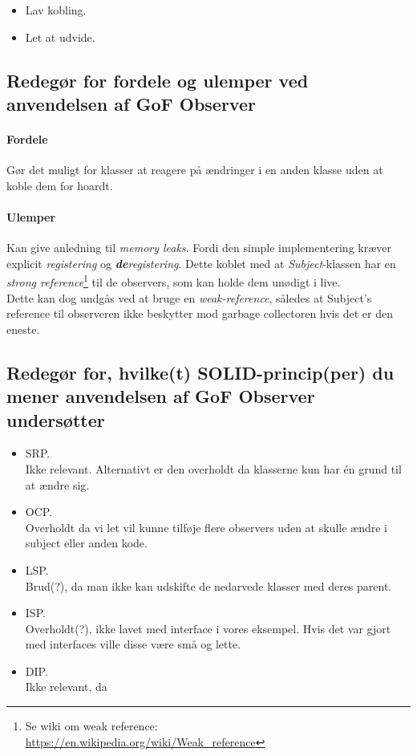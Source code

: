 \begin{itemize}
	\item Lav kobling.
	\item Let at udvide.
\end{itemize}

\subsection{Redegør for fordele og ulemper ved anvendelsen af GoF Observer}

\paragraph{Fordele}
Gør det muligt for klasser at reagere på ændringer i en anden klasse uden at koble dem for hoardt.

\paragraph{Ulemper}
Kan give anledning til \textit{memory leaks}. Fordi den simple implementering kræver explicit \textit{registering} og \textit{\textbf{de}registering}. Dette koblet med at \textit{Subject}-klassen har en \textit{strong reference}\footnote{Se wiki om weak reference:\\ \url{https://en.wikipedia.org/wiki/Weak_reference}} til de observers, som kan holde dem unødigt i live.\\
Dette kan dog undgås ved at bruge en \textit{weak-reference}, således at Subject's reference til observeren ikke beskytter mod garbage collectoren hvis det er den eneste.

\subsection{Redegør for, hvilke(t) SOLID-princip(per) du mener anvendelsen af GoF Observer undersøtter}
\begin{itemize}
	\item SRP.\\
	Ikke relevant. Alternativt er den overholdt da klasserne kun har én grund til at ændre sig.
	\item OCP.\\
	Overholdt da vi let vil kunne tilføje flere observers uden at skulle ændre i subject eller anden kode.
	\item LSP.\\
	Brud(?), da man ikke kan udskifte de nedarvede klasser med deres parent.
	\item ISP.\\
	Overholdt(?), ikke lavet med interface i vores eksempel. Hvis det var gjort med interfaces ville disse være små og lette. 
	\item DIP.\\
	Ikke relevant, da 
\end{itemize}